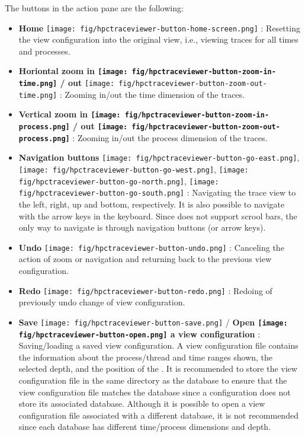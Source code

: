 The buttons in the action pane are the following:
\begin{itemize}

\item \textbf{Home} \texttt{[image: fig/hpctraceviewer-button-home-screen.png]} : Resetting the view configuration into the original view, i.e., viewing traces for all times and processes.
\item \textbf{Horiontal zoom in \texttt{[image: fig/hpctraceviewer-button-zoom-in-time.png]} / out }\texttt{[image: fig/hpctraceviewer-button-zoom-out-time.png]} : Zooming in/out the time dimension of the traces. 
\item \textbf{Vertical zoom in \texttt{[image: fig/hpctraceviewer-button-zoom-in-process.png]} / out \texttt{[image: fig/hpctraceviewer-button-zoom-out-process.png]} }: Zooming in/out the process dimension of the traces.
\item \textbf{Navigation buttons} \texttt{[image: fig/hpctraceviewer-button-go-east.png]}, \texttt{[image: fig/hpctraceviewer-button-go-west.png]}, \texttt{[image: fig/hpctraceviewer-button-go-north.png]}, \texttt{[image: fig/hpctraceviewer-button-go-south.png]} : Navigating the trace view to the left, right, up and bottom, respectively. It is also possible to navigate with the arrow keys in the keyboard. Since \traceview{} does not support scrool bars, the only way to navigate is through navigation buttons (or arrow keys).
\item \textbf{Undo} \texttt{[image: fig/hpctraceviewer-button-undo.png]} : Canceling the action of zoom or navigation and returning back to the previous view configuration.
\item \textbf{Redo} \texttt{[image: fig/hpctraceviewer-button-redo.png]} : Redoing of previously undo change of view configuration.
\item \textbf{Save} \texttt{[image: fig/hpctraceviewer-button-save.png]}  / \textbf{Open \texttt{[image: fig/hpctraceviewer-button-open.png]} a view configuration} : Saving/loading a saved view configuration. 
A view configuration file contains the information about the process/thread and time ranges shown, the selected depth, and the position of the \crosshair{}. 
It is recommended to store the view configuration file in the same directory as the database to ensure that the view configuration file matches the database since a configuration does not store its associated database. 
Although it is possible to open a view configuration file associated with a different database, it is not recommended since each database has different time/process dimensions and depth.


\end{itemize}

